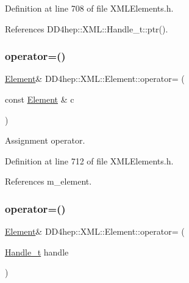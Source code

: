 Definition at line 708 of file X\+M\+L\+Elements.\+h.



References D\+D4hep\+::\+X\+M\+L\+::\+Handle\+\_\+t\+::ptr().

\hypertarget{class_d_d4hep_1_1_x_m_l_1_1_element_afa8ba01485168c3492bd913c22bc8c0d}{}\label{class_d_d4hep_1_1_x_m_l_1_1_element_afa8ba01485168c3492bd913c22bc8c0d} 
\subsubsection{\texorpdfstring{operator=()}{operator=()}\hspace{0.1cm}{\footnotesize\ttfamily [1/2]}}
{\footnotesize\ttfamily \hyperlink{class_d_d4hep_1_1_x_m_l_1_1_element}{Element}\& D\+D4hep\+::\+X\+M\+L\+::\+Element\+::operator= (\begin{DoxyParamCaption}\item[{const \hyperlink{class_d_d4hep_1_1_x_m_l_1_1_element}{Element} \&}]{c }\end{DoxyParamCaption})\hspace{0.3cm}{\ttfamily [inline]}}



Assignment operator. 



Definition at line 712 of file X\+M\+L\+Elements.\+h.



References m\+\_\+element.

\hypertarget{class_d_d4hep_1_1_x_m_l_1_1_element_a223f10555b456157ff26eb457a9e40e5}{}\label{class_d_d4hep_1_1_x_m_l_1_1_element_a223f10555b456157ff26eb457a9e40e5} 
\subsubsection{\texorpdfstring{operator=()}{operator=()}\hspace{0.1cm}{\footnotesize\ttfamily [2/2]}}
{\footnotesize\ttfamily \hyperlink{class_d_d4hep_1_1_x_m_l_1_1_element}{Element}\& D\+D4hep\+::\+X\+M\+L\+::\+Element\+::operator= (\begin{DoxyParamCaption}\item[{\hyperlink{class_d_d4hep_1_1_x_m_l_1_1_handle__t}{Handle\+\_\+t}}]{handle }\end{DoxyParamCaption})\hspace{0.3cm}{\ttfamily [inline]}}



